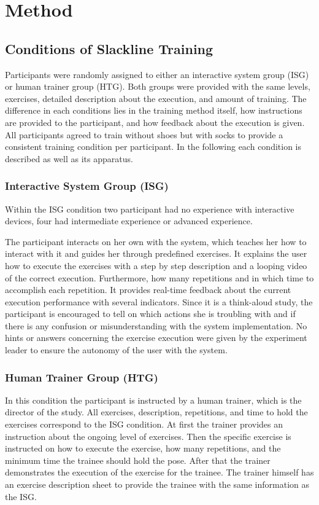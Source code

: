 \section{Method}\label{6_method}

\subsection{Conditions of Slackline Training}
Participants were randomly assigned to either an interactive system group (ISG) or human trainer group (HTG).
Both groups were provided with the same levels, exercises, detailed description about the execution, and amount of training.
The difference in each conditions lies in the training method itself, how instructions are provided to the participant, and how feedback about the execution is given. All participants agreed to train without shoes but with socks to provide a consistent training condition per participant.
In the following each condition is described as well as its apparatus.

\subsubsection{Interactive System Group (ISG)}
Within the ISG condition two participant had no experience with interactive devices, four had intermediate experience or advanced experience.

The participant interacts on her own with the system, which teaches her how to interact with it and guides her through predefined exercises.
It explains the user how to execute the exercises with a step by step description and a looping video of the correct execution.
Furthermore, how many repetitions and in which time to accomplish each repetition.
It provides real-time feedback about the current execution performance with several indicators.
Since it is a think-aloud study, the participant is encouraged to tell on which actions she is troubling with and if there is any confusion or misunderstanding with the system implementation.
No hints or answers concerning the exercise execution were given by the experiment leader to ensure the autonomy of the user with the system.

\subsubsection{Human Trainer Group (HTG)}
In this condition the participant is instructed by a human trainer, which is the director of the study.
All exercises, description, repetitions, and time to hold the exercises correspond to the ISG condition.
At first the trainer provides an instruction about the ongoing level of exercises.
Then the specific exercise is instructed on how to execute the exercise, how many repetitions, and the minimum time the trainee should hold the pose.
After that the trainer demonstrates the execution of the exercise for the trainee.
The trainer himself has an exercise description sheet to provide the trainee with the same information as the ISG.

